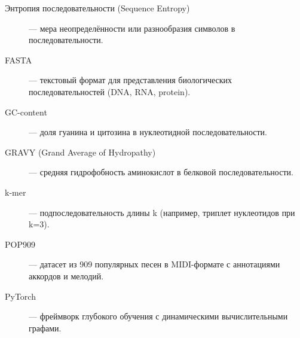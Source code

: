 \begin{description}
\item[Энтропия последовательности (Sequence Entropy)] — мера неопределённости или разнообразия символов в последовательности.

\item[FASTA] — текстовый формат для представления биологических последовательностей (DNA, RNA, protein).

\item[GC-content] — доля гуанина и цитозина в нуклеотидной последовательности.

\item[GRAVY (Grand Average of Hydropathy)] — средняя гидрофобность аминокислот в белковой последовательности.

\item[k-mer] — подпоследовательность длины k (например, триплет нуклеотидов при k=3).

\item[POP909] — датасет из 909 популярных песен в MIDI-формате с аннотациями аккордов и мелодий.

\item[PyTorch] — фреймворк глубокого обучения с динамическими вычислительными графами.

\end{description}
